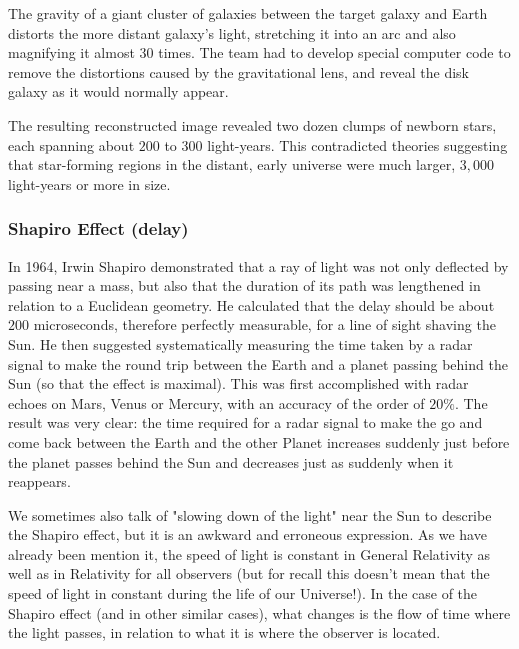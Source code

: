 	The gravity of a giant cluster of galaxies between the target galaxy and Earth distorts the more distant galaxy's light, stretching it into an arc and also magnifying it almost 30 times. The team had to develop special computer code to remove the distortions caused by the gravitational lens, and reveal the disk galaxy as it would normally appear.
	
	The resulting reconstructed image revealed two dozen clumps of newborn stars, each spanning about $200$ to $300$ light-years. This contradicted theories suggesting that star-forming regions in the distant, early universe were much larger, $3,000 $light-years or more in size.
	
	\subsubsection{Shapiro Effect (delay)}\label{shapiro effect}
	In 1964,  Irwin Shapiro demonstrated that a ray of light was not only deflected by passing near a mass, but also that the duration of its path was lengthened in relation to a Euclidean geometry. He calculated that the delay should be about $200$ microseconds, therefore perfectly measurable, for a line of sight shaving the Sun. He then suggested systematically measuring the time taken by a radar signal to make the round trip between the Earth and a planet passing behind the Sun (so that the effect is maximal). This was first accomplished with radar echoes on Mars, Venus or Mercury, with an accuracy of the order of $20\%$. The result was very clear: the time required for a radar signal to make the go and come back between the Earth and the other Planet increases suddenly just before the planet passes behind the Sun and decreases just as suddenly when it reappears.
	\begin{tcolorbox}[title=Remark,colframe=black,arc=10pt]
	We sometimes also talk of "slowing down of the light" near the Sun to describe the Shapiro effect, but it is an awkward and erroneous expression. As we have already been mention it, the speed of light is constant in General Relativity as well as in Relativity for all observers (but for recall this doesn't mean that the speed of light in constant during the life of our Universe!). In the case of the Shapiro effect (and in other similar cases), what changes is the flow of time where the light passes, in relation to what it is where the observer is located.
	\end{tcolorbox}
